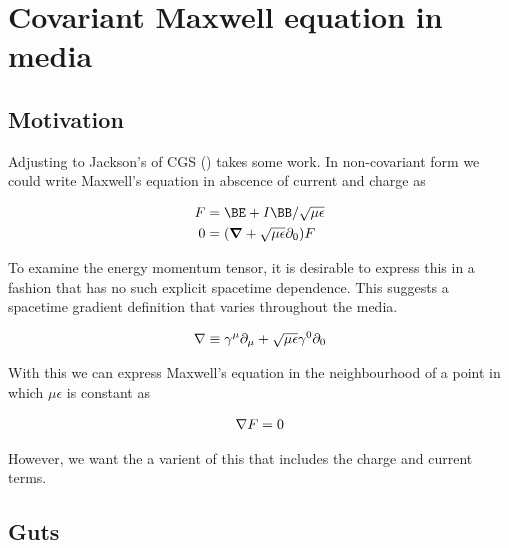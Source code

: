 

\chapter{Covariant Maxwell equation in media}
\label{chap:covariantMedia}
{}
\date{Aug 10, 2009}

\beginArtWithToc

\section{Motivation}

Adjusting to Jackson's of CGS (\cite{jackson1975cew}) takes some work.  In non-covariant form we could write Maxwell's equation in abscence of current and charge as

\begin{align}\label{eqn:foo1}
F &= \BE + I\BB/\sqrt{\mu\epsilon} \\
0 &= (\spacegrad + \sqrt{\mu\epsilon} \partial_0) F 
\end{align}

To examine the energy momentum tensor, it is desirable to express this in a fashion that has no such explicit spacetime dependence.  This suggests a spacetime gradient definition that varies throughout the media.

\begin{align}\label{eqn:foo2}
\nabla \equiv \gamma^\mu \partial_\mu + \sqrt{\mu\epsilon} \gamma^0 \partial_0
\end{align}

With this we can express Maxwell's equation in the neighbourhood of a point in which $\mu\epsilon$ is constant as

\begin{align}\label{eqn:foo3}
\nabla F = 0
\end{align}

However, we want the a varient of this that includes the charge and current terms.

\section{Guts}

\EndNoBibArticle
